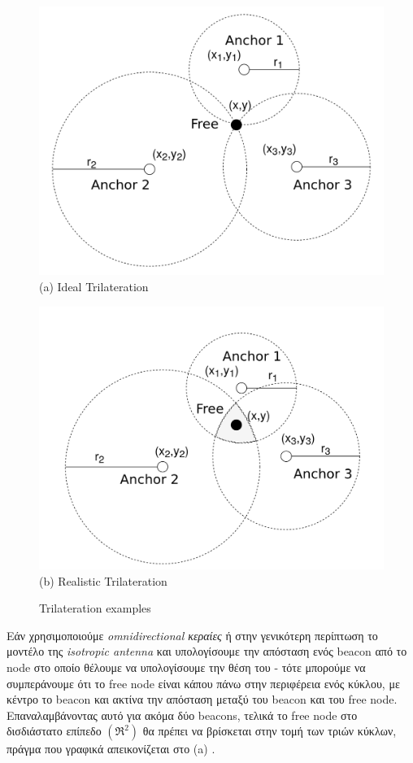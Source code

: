 \begin{figure} [H]
	\centering
		\begin{minipage}{.5\textwidth}
			\centering
			\includegraphics[width=0.7\linewidth]{../Photos/Trilateration-ideal.png}\\
			{(a) Ideal Trilateration}
		\end{minipage}%
		\begin{minipage}{.5\textwidth}
			\centering
			\includegraphics[width=.7\linewidth]{../Photos/Trilateration-actual.png}\\
			{(b) Realistic Trilateration}
		\end{minipage}
    \hfill \break
    \decoRule
    \caption[Trilateration examples]{Trilateration examples}
    \label{fig:Trilateration-examples}
\end{figure}

Εάν χρησιμοποιούμε \emph{omnidirectional κεραίες} \cite{Omnidirectional-antenna} ή στην γενικότερη περίπτωση το μοντέλο της \emph{isotropic antenna} \cite{Isotropic-radiator} και υπολογίσουμε την απόσταση ενός beacon από το node στο οποίο θέλουμε να υπολογίσουμε την θέση του -
τότε μπορούμε να συμπεράνουμε ότι το free node είναι κάπου πάνω στην περιφέρεια ενός 
κύκλου, με κέντρο το beacon και ακτίνα την απόσταση μεταξύ του beacon και του free node. 
Επαναλαμβάνοντας αυτό για ακόμα δύο beacons, τελικά το free node στο δισδιάστατο επίπεδο $(\mathfrak{R}^2)$ θα πρέπει να βρίσκεται στην τομή των τριών κύκλων, πράγμα που γραφικά 
απεικονίζεται στο  (a) \cite{RSSI-trilateration-Range_based}.

